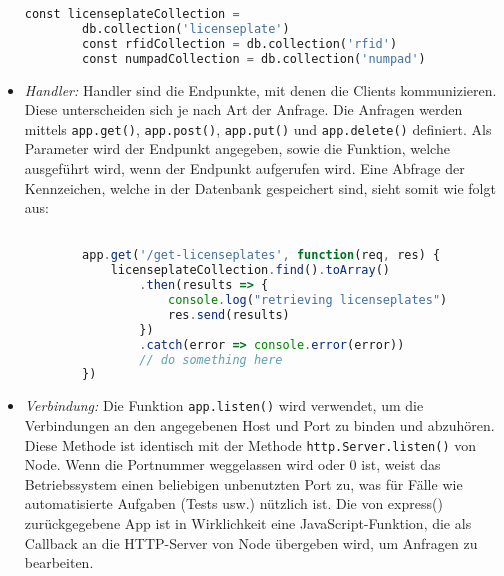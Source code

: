 \begin{itemize}
\begin{lstlisting}[language=Python, caption=Konfiguration der Datenbankanbindung, label=lst:impl:dbconf]
        const licenseplateCollection =
        db.collection('licenseplate')
        const rfidCollection = db.collection('rfid')
        const numpadCollection = db.collection('numpad')
    \end{lstlisting}
    \item \textit{Handler: } Handler sind die Endpunkte, mit denen die Clients kommunizieren. Diese unterscheiden sich je nach Art der Anfrage. Die Anfragen werden mittels \verb|app.get()|, \verb|app.post()|, \verb|app.put()| und \verb|app.delete()| definiert. Als Parameter wird der Endpunkt angegeben, sowie die Funktion, welche ausgeführt wird, wenn der Endpunkt aufgerufen wird. Eine Abfrage der Kennzeichen, welche in der Datenbank gespeichert sind, sieht somit wie folgt aus: 
    \begin{lstlisting}[language=JavaScript, caption=Abfrage der Kennzeichen, label=lst:impl:getlicenseplates]

        app.get('/get-licenseplates', function(req, res) {
            licenseplateCollection.find().toArray()
                .then(results => {
                    console.log("retrieving licenseplates")
                    res.send(results)
                })
                .catch(error => console.error(error))
                // do something here
        })
    \end{lstlisting}
    \item \textit{Verbindung:} Die Funktion \verb|app.listen()| wird verwendet, um die Verbindungen an den angegebenen Host und Port zu binden und abzuhören. Diese Methode ist identisch mit der Methode \verb|http.Server.listen()| von Node.
    Wenn die Portnummer weggelassen wird oder 0 ist, weist das Betriebssystem einen beliebigen unbenutzten Port zu, was für Fälle wie automatisierte Aufgaben (Tests usw.) nützlich ist.
    Die von express() zurückgegebene App ist in Wirklichkeit eine JavaScript-Funktion, die als Callback an die HTTP-Server von Node übergeben wird, um Anfragen zu bearbeiten.
    \end{itemize}